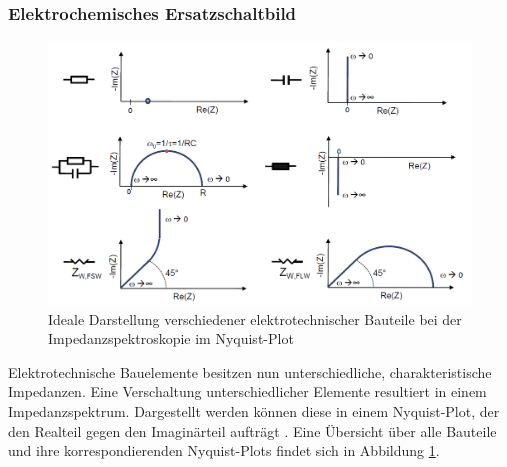 \documentclass[a4paper, 11pt, headsepline,footsepline,twoside,abstract]{scrbook}
\begin{document}
\subsubsection{Elektrochemisches Ersatzschaltbild}
\begin{figure}
	\centering
	\includegraphics[width=1.0\columnwidth]{images/is_bauteile.png}
	\caption{Ideale Darstellung verschiedener elektrotechnischer Bauteile bei der Impedanzspektroskopie im Nyquist-Plot \cite{bub_skript}}
	\label{bauteile_is}
\end{figure}
Elektrotechnische Bauelemente besitzen nun unterschiedliche, charakteristische Impedanzen. Eine Verschaltung unterschiedlicher Elemente resultiert in einem Impedanzspektrum. Dargestellt werden können diese in einem Nyquist-Plot, der den Realteil gegen den Imaginärteil aufträgt \cite{Hamann2005}. Eine Übersicht über alle Bauteile und ihre korrespondierenden Nyquist-Plots findet sich in Abbildung \ref{bauteile_is}.
\end{document}
